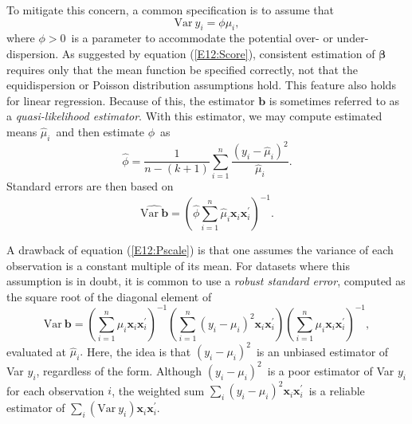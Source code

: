 {To mitigate this concern, a common specification is to assume that
\begin{equation}\label{E12:Pscale}
\mathrm{Var~}y_i=\phi \mu_i,
\end{equation}
where $\phi >0$\ is a parameter to accommodate the potential over-
or under-dispersion. As suggested by equation (\ref{E12:Score}),
consistent estimation of $\boldsymbol \beta$ requires only that the
mean function be specified correctly, not that the equidispersion or
Poisson distribution assumptions hold. This feature also holds for
linear regression. Because of this, the estimator $\mathbf{b}$ is
sometimes referred to as a \emph{quasi-likelihood estimator}. With
this estimator, we may compute estimated means $\widehat{\mu}_i$\
and then estimate $\phi $\ as\
\begin{equation}\label{E12:QuasiEstimator}
\widehat{\phi }=\frac{1}{n-(k+1)}\sum\limits_{i=1}^{n}\frac{\left( y_i-%
\widehat{\mu }_i\right)^2}{\widehat{\mu }_i}.
\end{equation}
Standard errors are then based on
\begin{equation*}
\widehat{\mathrm{Var~}\mathbf{b}}=\left( \widehat{\phi }\sum%
\limits_{i=1}^{n}\widehat{\mu }_i\mathbf{x}_i\mathbf{x}_i^{\prime
}\right)^{-1}.
\end{equation*}

A drawback of equation (\ref{E12:Pscale}) is that one assumes the
variance of each observation is a constant multiple of its mean. For
datasets where this assumption is in doubt, it is common to use a
\emph{robust standard error}, computed as the square root of the
diagonal element of
\begin{equation*}
\mathrm{Var~}\mathbf{b}=\left( \sum\limits_{i=1}^{n}\mu_i\mathbf{x}_i%
\mathbf{x}_i^{\prime }\right)^{-1}\left( \sum\limits_{i=1}^{n}\left(
y_i-\mu_i\right)^2\mathbf{x}_i\mathbf{x}_i^{\prime }\right) \left(
\sum\limits_{i=1}^{n}\mu_i\mathbf{x}_i\mathbf{x}_i^{\prime
}\right)^{-1},
\end{equation*}
evaluated at $\widehat{\mu }_i.$ Here, the idea is that $\left(
y_i-\mu_i\right)^2$\ is an unbiased estimator of Var $y_i$,
regardless of the form. Although $\left( y_i-\mu_i\right)^2$\ is a
poor estimator of Var $y_i$ for each observation $i$, the weighted
sum $ \sum\nolimits_i\left( y_i-\mu_i\right)^2\mathbf{x}_i\mathbf{x}
_i^{\prime }$\ is a reliable estimator of $\sum\nolimits_i\left(
\mathrm{Var~}y_i\right) \mathbf{x}_i\mathbf{x}_i^{\prime }$.

}
